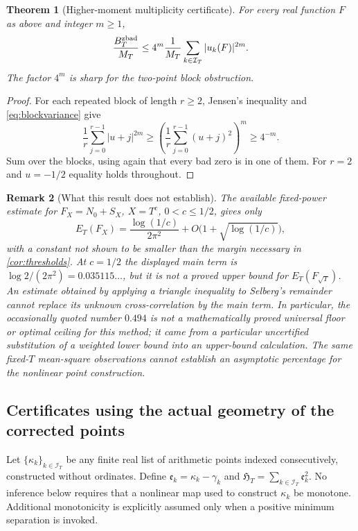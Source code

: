 \documentclass[11pt,reqno]{amsart}
\numberwithin{equation}{section}
\newtheorem{theorem}{Theorem}[section]
\newtheorem{remark}[theorem]{Remark}
\begin{document}
\begin{theorem}[Higher-moment multiplicity certificate]
\label{thm:blockmoments}
For every real function $F$ as above and integer $m\ge1$,
\begin{equation}\label{eq:blockmoments}
\frac{B_T^{\rm zbad}}{M_T}\le
4^m\frac1{M_T}\sum_{k\in\mathcal I_T}|u_k(F)|^{2m}.
\end{equation}
The factor $4^m$ is sharp for the two-point block obstruction.
\end{theorem}
\begin{proof}
For each repeated block of length $r\ge2$, Jensen's inequality and
\eqref{eq:blockvariance} give
\[
\frac1r\sum_{j=0}^{r-1}|u+j|^{2m}
\ge\left(\frac1r\sum_{j=0}^{r-1}(u+j)^2\right)^m
\ge4^{-m}.
\]
Sum over the blocks, using again that every bad zero is in one of them.
For $r=2$ and $u=-1/2$ equality holds throughout.
\end{proof}

\begin{remark}[What this result does not establish]
\label{rem:unprovedpercentage}
The available fixed-power estimate for $F_X=N_0+S_X$, $X=T^c$,
$0<c\le1/2$, gives only
\[
E_T(F_X)=\frac{\log(1/c)}{2\pi^2}
+O\bigl(1+\sqrt{\log(1/c)}\bigr),
\]
with a constant not shown to be smaller than the margin necessary in
\cref{cor:thresholds}.  At $c=1/2$ the displayed main term is
$\log2/(2\pi^2)=0.035115\dots$, but it is \emph{not} a proved upper
bound for $E_T(F_{\sqrt T})$.  An estimate obtained by applying a
triangle inequality to Selberg's remainder cannot replace its unknown
cross-correlation by the main term.  In particular, the occasionally
quoted number $0.494$ is not a mathematically proved universal floor
or optimal ceiling for this method; it came from a particular
uncertified substitution of a weighted lower bound into an upper-bound
calculation.  The same fixed-$T$ mean-square observations cannot establish
an asymptotic percentage for the nonlinear point construction.
\end{remark}

\subsection{Certificates using the actual geometry of the corrected points}
\label{subsec:gapcertificates}
Let $\{\kappa_k\}_{k\in\mathcal I_T}$ be any finite real list of
arithmetic points indexed consecutively, constructed without ordinates.
Define $\mathfrak e_k=\kappa_k-\gamma_k$ and
$\mathfrak H_T=\sum_{k\in\mathcal I_T}\mathfrak e_k^2$.
No inference below requires that a nonlinear map used to construct
$\kappa_k$ be monotone.  Additional monotonicity is explicitly
assumed only when a positive minimum separation is invoked.
\end{document}
